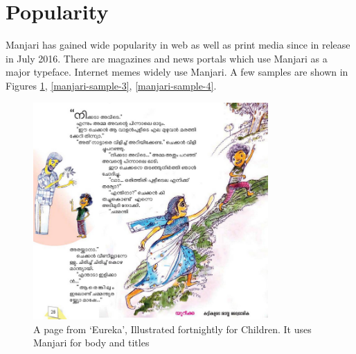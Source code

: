 \documentclass[11pt,twoside,a4paper,parskip=half]{scrartcl}
\begin{document}
\section{Popularity}

Manjari has gained wide popularity in web as well as print media since in release in July 2016. There are magazines and news portals which use Manjari as a major typeface. Internet memes widely use Manjari. A few samples are shown in Figures \ref{manjari-sample-1}, \ref{manjari-sample-3}, \ref{manjari-sample-4}. 

\begin{figure}[h!]
	\includegraphics[width=0.8\textwidth]{images/manjari-sample-1.png}
	\caption{A page from `Eureka', Illustrated fortnightly for Children. It uses Manjari for body and titles}
	\label{manjari-sample-1}
\end{figure}
\end{document}
